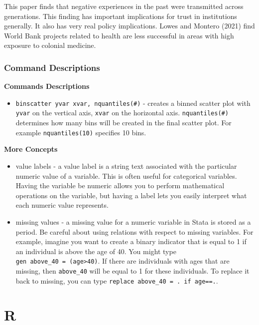 \documentclass[
]{book}
\providecommand{\tightlist}{%
  \setlength{\itemsep}{0pt}\setlength{\parskip}{0pt}}
\begin{document}
This paper finds that negative experiences in the past were transmitted across generations. This finding has important implications for trust in institutions generally. It also has very real policy implications. Lowes and Montero (2021) find World Bank projects related to health are less successful in areas with high exposure to colonial medicine.

\section*{Command Descriptions}\label{command-descriptions-2}

\textbf{Commands Descriptions}

\begin{itemize}
\tightlist
\item
  \texttt{binscatter\ yvar\ xvar,\ nquantiles(\#)} - creates a binned scatter plot with \texttt{yvar} on the vertical axis, \texttt{xvar} on the horizontal axis. \texttt{nquantiles(\#)} determines how many bins will be created in the final scatter plot. For example \texttt{nquantiles(10)} specifies 10 bins.
\end{itemize}

\textbf{More Concepts}

\begin{itemize}
\item
  value labels - a value label is a string text associated with the particular numeric value of a variable. This is often useful for categorical variables. Having the variable be numeric allows you to perform mathematical operations on the variable, but having a label lets you easily interpret what each numeric value represents.
\item
  missing values - a missing value for a numeric variable in Stata is stored as a period. Be careful about using relations with respect to missing variables. For example, imagine you want to create a binary indicator that is equal to 1 if an individual is above the age of 40. You might type \texttt{gen\ above\_40\ =\ (age\textgreater{}40)}. If there are individuals with ages that are missing, then \texttt{above\_40} will be equal to 1 for these individuals. To replace it back to missing, you can type \texttt{replace\ above\_40\ =\ .\ if\ age==.}.
\end{itemize}

\part{R}\label{part-r}
\end{document}
